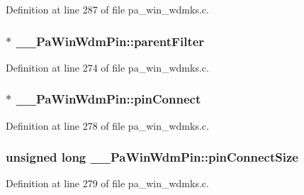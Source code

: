 Definition at line 287 of file pa\+\_\+win\+\_\+wdmks.\+c.

\subsubsection[{\texorpdfstring{parent\+Filter}{parentFilter}}]{$\ast$ \+\_\+\+\_\+\+Pa\+Win\+Wdm\+Pin\+::parent\+Filter}\hypertarget{struct_____pa_win_wdm_pin_a6f391ad5ef481be61f92a2c99f8ce3a1}{}\label{struct_____pa_win_wdm_pin_a6f391ad5ef481be61f92a2c99f8ce3a1}


Definition at line 274 of file pa\+\_\+win\+\_\+wdmks.\+c.

\subsubsection[{\texorpdfstring{pin\+Connect}{pinConnect}}]{$\ast$ \+\_\+\+\_\+\+Pa\+Win\+Wdm\+Pin\+::pin\+Connect}\hypertarget{struct_____pa_win_wdm_pin_a2c0a3fa53ea7dbc62ef29f9ee4b5ff2c}{}\label{struct_____pa_win_wdm_pin_a2c0a3fa53ea7dbc62ef29f9ee4b5ff2c}


Definition at line 278 of file pa\+\_\+win\+\_\+wdmks.\+c.

\subsubsection[{\texorpdfstring{pin\+Connect\+Size}{pinConnectSize}}]{\setlength{\rightskip}{0pt plus 5cm}unsigned long \+\_\+\+\_\+\+Pa\+Win\+Wdm\+Pin\+::pin\+Connect\+Size}\hypertarget{struct_____pa_win_wdm_pin_a77f9537f17bc86095bfc5646de673da5}{}\label{struct_____pa_win_wdm_pin_a77f9537f17bc86095bfc5646de673da5}


Definition at line 279 of file pa\+\_\+win\+\_\+wdmks.\+c.

